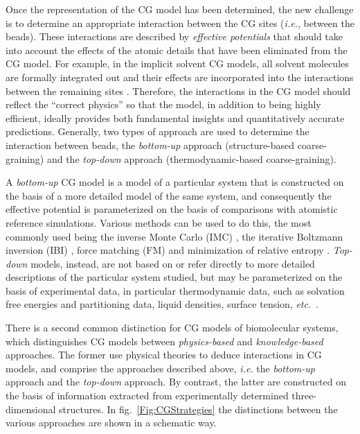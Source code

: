 \documentclass[10pt,a4paper]{book}
\theoremstyle{definition}
\begin{document}
Once the representation of the CG model has been determined, the new challenge is to determine an appropriate interaction between the CG sites (\textit{i.e.}, between the beads). These interactions are described by \emph{effective potentials} that should take into account the effects of the atomic details that have been eliminated from the CG model. For example, in the implicit solvent CG models, all solvent molecules are formally integrated out and their effects are incorporated into the interactions between the remaining sites \cite{Silbermann2006}.
Therefore, the interactions in the CG model should reflect the ``correct physics'' so that the model, in addition to being highly efficient, ideally provides both fundamental insights and quantitatively accurate predictions. 
%
Generally, two types of approach are used to determine the interaction between beads, the \emph{bottom-up} approach (structure-based coarse-graining) and the \emph{top-down} approach (thermodynamic-based coarse-graining).

\noindent
A \emph{bottom-up} CG model is a model of a particular system that is constructed on the basis of a more detailed model of the same system, and consequently the effective potential is parameterized on the basis of comparisons with atomistic reference simulations. Various methods can be used to do this, the most commonly used being the inverse Monte Carlo (IMC) \cite{Lyubartsev1995}, the iterative Boltzmann inversion (IBI) \cite{Reith2003}, force matching (FM) \cite{Izvekov2004,Izvekov2005,Noid2008} and minimization of relative entropy \cite{Chaimovich2011}.
%
\emph{Top-down} models, instead, are not based on or refer directly to more detailed descriptions of the particular system studied, but may be parameterized on the basis of experimental data, in particular thermodynamic data, such as solvation free energies and partitioning data, liquid densities, surface tension, \textit{etc.}~\cite{CLEMENTI2008,Honeycutt1990,Nielsen2003}.

\noindent
There is a second common distinction for CG models of biomolecular systems, which distinguishes CG models between \emph{physics-based} and \emph{knowledge-based} approaches. The former use physical theories to deduce interactions in CG models, and comprise the approaches described above, \textit{i.e.} the \emph{bottom-up} approach and the \emph{top-down} approach. By contrast, the latter are constructed on the basis of information extracted from experimentally determined three-dimensional structures.
In fig.~\ref{Fig:CGStrategies} the distinctions between the various approaches are shown in a schematic way. 
\end{document}
